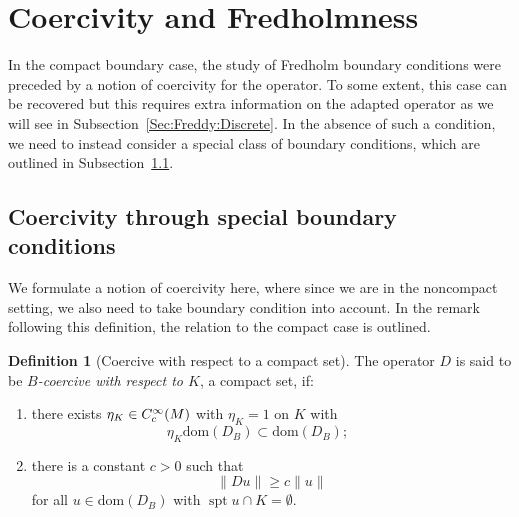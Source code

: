 \documentclass[a4paper,10pt,reqno]{amsart}
\newcommand{\norm}[1]{\| #1 \|}%
\newcommand{\Ck}[2][{}]{{\rm C}^{#2}_{\rm #1}}%
\newcommand{\dom}{\mathrm{dom}}
\DeclareMathOperator{\spt}{spt}%
\theoremstyle{definition}
\newtheorem{definition}[theorem]{Definition}
\begin{document}
\section{Coercivity and Fredholmness}
\label{Sec:Freddy}

In the compact boundary case, the study of Fredholm boundary conditions were preceded by a notion of coercivity for the operator.
To some extent, this case can be recovered but this requires extra information on the adapted operator as we will see in Subsection~\ref{Sec:Freddy:Discrete}.
In the absence of such a condition, we need to instead consider a special class of boundary conditions, which are outlined in Subsection~\ref{Sec:Freddy:BCs}.

\subsection{Coercivity through special boundary conditions}
\label{Sec:Freddy:BCs} 

We formulate a notion of coercivity here, where since we are in the noncompact setting, we also need to take boundary condition into account.
In the remark following this definition, the relation to the compact case is outlined.

\begin{definition}[Coercive with respect to a compact set]
\label{Def:Coercive}
The operator $D$ is said to be \emph{$B$-coercive with respect to $K$}, a compact set, if:
\begin{enumerate}[label=(\roman*), labelwidth=0pt, labelindent=2pt, leftmargin=21pt]
\item \label{Def:Coercive:1}
      there exists $\eta_{K} \in \Ck[c]{\infty}(M)$ with $\eta_K = 1$ on $K$ with
      $$ \eta_K \dom(D_B) \subset \dom(D_B);\qquad $$
\item \label{Def:Coercive:2}
      there is a constant $c > 0$ such that
      $$ \norm{Du} \geq c \norm{u}$$
      for all $u \in \dom(D_B)$ with $\spt u \cap K = \emptyset$.
\end{enumerate}
\end{definition}
\end{document}
